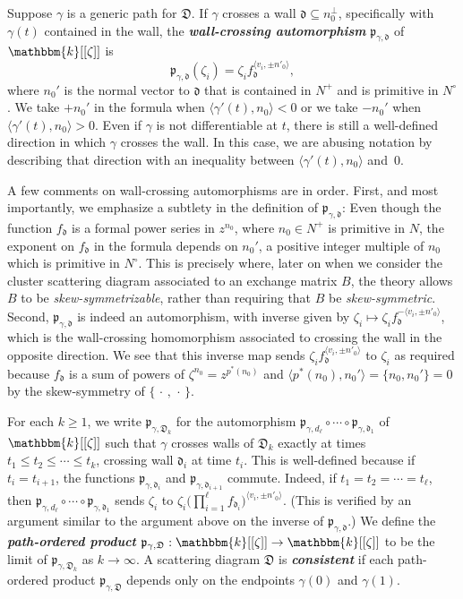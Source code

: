 \documentclass{amsart}
\theoremstyle{definition}
\theoremstyle{remark}
\numberwithin{equation}{section}
\newcommand{\newword}[1]{\textbf{\emph{#1}}}
\newcommand{\set}[1]{{\lbrace #1 \rbrace}}
\newcommand{\br}[1]{{\langle #1 \rangle}}
\newcommand{\D}{{\mathfrak D}}
\newcommand{\p}{{\mathfrak p}}
\newcommand{\0}{{\mathbf{0}}}
\renewcommand{\k}{\mathbbm{k}}
\renewcommand{\d}{{\mathfrak d}}
\begin{document}
Suppose $\gamma$ is a generic path for $\D$.
If $\gamma$ crosses a wall $\d\subseteq n_0^\perp$, specifically with $\gamma(t)$ contained in the wall, the \newword{wall-crossing automorphism} $\p_{\gamma,\d}$ of $\k[[\zeta]]$ is
\begin{equation}\label{p def}
\p_{\gamma,\d}(\zeta_i)=\zeta_if_\d^\br{v_i,\pm n'_0},
\end{equation}
where $n_0'$ is the normal vector to $\d$ that is contained in $N^+$ and is primitive in $N^\circ$.
We take $+n_0'$ in the formula when $\br{\gamma'(t),n_0}<0$ or we take $-n_0'$ when ${\br{\gamma'(t),n_0}>0}$.
Even if $\gamma$ is not differentiable at $t$, there is still a well-defined direction in which $\gamma$ crosses the wall.  
In this case, we are abusing notation by describing that direction with an inequality between $\br{\gamma'(t),n_0}$ and~$0$.

A few comments on wall-crossing automorphisms are in order.
First, and most importantly, we emphasize a subtlety in the definition of $\p_{\gamma,\d}$:
Even though the function $f_\d$ is a formal power series in $z^{n_0}$, where $n_0\in N^+$ is primitive in $N$, the exponent on $f_\d$ in the formula depends on $n_0'$, a positive integer multiple of $n_0$ which is primitive in $N^\circ$.
This is precisely where, later on when we consider the cluster scattering diagram associated to an exchange matrix $B$, the theory allows $B$ to be \emph{skew-symmetrizable}, rather than requiring that $B$ be \emph{skew-symmetric}.
Second, $\p_{\gamma,\d}$ is indeed an automorphism, with inverse given by $\zeta_i\mapsto \zeta_if_\d^{-\br{v_i,\pm n'_0}}$, which is the wall-crossing homomorphism associated to crossing the wall in the opposite direction.
We see that this inverse map sends $\zeta_if_\d^\br{v_i,\pm n'_0}$ to $\zeta_i$ as required because $f_\d$ is a sum of powers of $\zeta^{n_0}=z^{p^*(n_0)}$ and $\br{p^*(n_0),n_0'}=\set{n_0,n_0'}=0$ by the skew-symmetry of $\set{\,\cdot\,,\,\cdot\,}$.

For each $k\ge 1$, we write $\p_{\gamma,\D_k}$ for the automorphism $\p_{\gamma,d_\ell}\circ\cdots\circ\p_{\gamma,\d_1}$ of $\k[[\zeta]]$ such that $\gamma$ crosses walls of $\D_k$ exactly at times $t_1\le t_2\le\cdots\le t_k$, crossing wall $\d_i$ at time $t_i$.
This is well-defined because if $t_i=t_{i+1}$, the functions $\p_{\gamma,\d_i}$ and $\p_{\gamma,\d_{i+1}}$ commute.
Indeed, if $t_1=t_2=\cdots=t_\ell$, then $\p_{\gamma,d_\ell}\circ\cdots\circ\p_{\gamma,\d_1}$ sends $\zeta_i$ to $\zeta_i\bigl(\prod_{i=1}^\ell f_{\d_i}\bigr)^\br{v_i,\pm n'_0}$.
(This is verified by an argument similar to the argument above on the inverse of $\p_{\gamma,\d}$.)
We define the \newword{path-ordered product} $\p_{\gamma,\D}:\k[[\zeta]]\to\k[[\zeta]]$ to be the limit of $\p_{\gamma,\D_k}$ as $k\to\infty$.
A scattering diagram $\D$ is \newword{consistent} if each path-ordered product $\p_{\gamma,\D}$ depends only on the endpoints $\gamma(0)$ and $\gamma(1)$.
\end{document}
